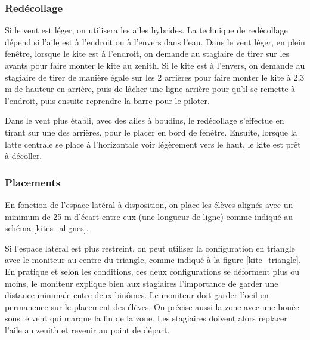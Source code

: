 \documentclass[11pt,a4paper]{report}
\begin{document}
\subsubsection{Redécollage}
Si le vent est léger, on utilisera les ailes hybrides. La technique
de redécollage dépend si l'aile est à l'endroit ou à l'envers dans l'eau.
Dans le vent léger, en plein fen\^etre, lorsque
le kite est à l'endroit, on demande au stagiaire de tirer  sur les avants
pour faire monter le kite au zenith. 
Si le kite est à l'envers, on demande au stagiaire de tirer de manière
égale sur les 2 arrières pour faire monter le kite à 2,3 m de hauteur en arrière, 
puis de lâcher une ligne arrière pour qu'il se remette à l'endroit,
puis ensuite reprendre la barre pour le piloter.

Dans le vent plus établi, avec des ailes à boudins, le redécollage s'effectue
en tirant sur une des arrières, pour le placer en bord de fenêtre.
Ensuite, lorsque la latte centrale se place à l'horizontale voir légèrement vers
le haut, le kite est pr\^et à décoller.

\subsubsection{Placements}
En fonction de l'espace latéral à disposition, on place les élèves
alignés avec un minimum de 25 m d'écart entre eux (une longueur de ligne) 
comme indiqué au schéma \ref{kites_alignes}.

Si l'espace latéral est plus restreint, on peut utiliser la configuration
en triangle avec le moniteur au centre du triangle, comme indiqué à la figure
\ref{kite_triangle}.
En pratique et selon les conditions, ces deux configurations se déforment plus ou moins, 
le moniteur explique bien aux stagiaires l'importance de garder une distance minimale 
entre deux binômes. Le moniteur doit garder l'oeil en permanence sur le
placement des élèves. On précise aussi la zone avec une bouée sous le vent qui marque
la fin de la zone. Les stagiaires doivent alors replacer l'aile au zenith et 
revenir au point de départ.
\end{document}
